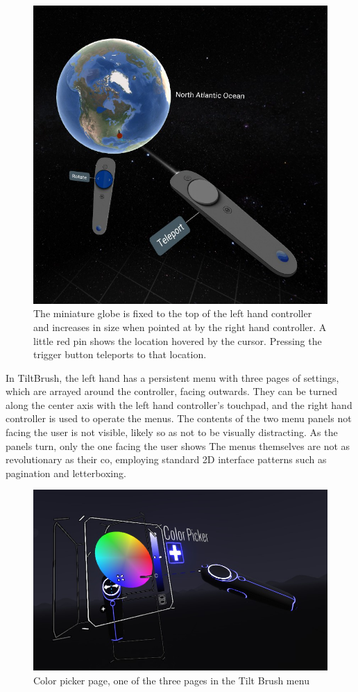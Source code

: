 \documentclass{tufte-book} %
\begin{document}
\begin{figure}
  \includegraphics{globe.png}
  \caption{The miniature globe is fixed to the top of the left hand controller and increases in size when pointed at by the right hand controller. A little red pin shows the location hovered by the cursor. Pressing the trigger button teleports to that location.}
  \label{fig:globe}
\end{figure}

In TiltBrush, the left hand has a persistent menu with three pages of settings, which are arrayed around the controller, facing outwards. They can be turned along the center axis with the left hand controller's touchpad, and the right hand controller is used to operate the menus.
The contents of the two menu panels not facing the user is not visible, likely so as not to be visually distracting. As the panels turn, only the one facing the user shows
The menus themselves are not as revolutionary as their co, employing standard 2D interface patterns such as pagination and letterboxing.

\begin{figure}
  \includegraphics{tiltbrushmenu.png}
  \caption{Color picker page, one of the three pages in the Tilt Brush menu}
  \label{fig:tiltbrushmenu}
\end{figure}
\end{document}
